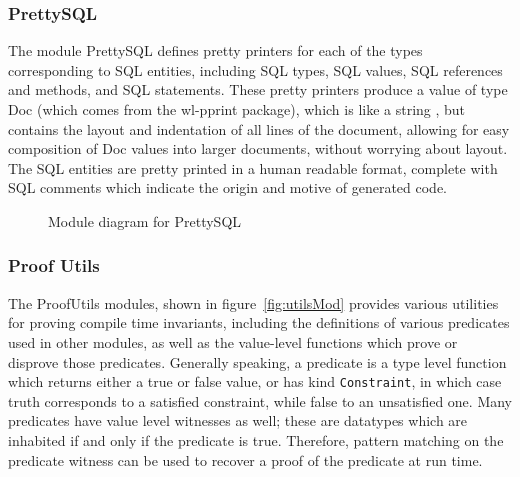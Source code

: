 \subsubsection{PrettySQL}

The module PrettySQL defines pretty printers for each of the types
corresponding to SQL entities, including SQL types, SQL values, SQL references
and methods, and SQL statements. These pretty printers produce a value of
type Doc (which comes from the wl-pprint package), which is like a string
, but contains the layout and indentation of all lines of the document,
allowing for easy composition of Doc values into larger documents, without
worrying about layout. The SQL entities are pretty printed in a human
readable format, complete with SQL comments which indicate the origin
and motive of generated code. 


\begin{figure}[!ht]
    \caption{Module diagram for PrettySQL} 
        \label{fig:prettySQL}
    \end{figure}

\subsubsection{Proof Utils}

The ProofUtils modules, shown in 
figure~\ref{fig:utilsMod} provides various
utilities for proving compile time invariants, 
including the definitions of
various predicates used in other modules, as well as 
the value-level functions
which prove or disprove those predicates. Generally 
speaking, a predicate is a
type level function which returns either a true or 
false value, or has kind
\lstinline{Constraint}, in which case truth corresponds 
to a satisfied
constraint, while false to an unsatisfied one. Many 
predicates have value level
witnesses as well; these are datatypes which are 
inhabited if and only if the
predicate is true.  Therefore, pattern matching on the 
predicate witness can be used to recover a proof of the predicate at run time.

